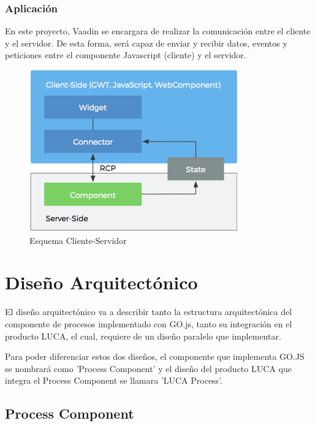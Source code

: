 \documentclass[a4paper,12pt]{book}
\begin{document}
 			\subsection{Aplicación}
 				En este proyecto, Vaadin se encargara de realizar la comunicación entre el cliente y el servidor. De esta forma, será capaz de enviar y recibir datos, eventos y peticiones entre el componente Javascript (cliente) y el servidor.
 			
 			
	 			\begin{figure}[h]
	 				\centering
	 				\includegraphics[scale=1.5]{schema.png}
	 				\caption{Esquema Cliente-Servidor}\label{fig:schema}
	 			\end{figure}
 			
 		
	
	\afterpage{\null\newpage}
	\newpage
	
	\chapter{Diseño Arquitectónico}
	
	El diseño arquitectónico va a describir tanto la estructura arquitectónica del componente de procesos implementado con GO.js, tanto su integración en el producto LUCA, el cual, requiere de un diseño paralelo que implementar.
	
	
	\minitoc
	
	\vspace{5mm}
	
	Para poder diferenciar estos dos diseños, el componente que implementa GO.JS se nombrará como 'Process Component' y el diseño del producto LUCA que integra el Process Component se llamara 'LUCA Process'.
	
		\section{Process Component}
		
\end{document}
